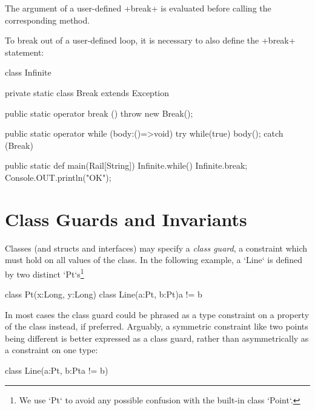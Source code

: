 The argument of a user-defined \xcd+break+ is
evaluated before calling the corresponding method.

\begin{ex}
  To break out of a user-defined loop, it is necessary to also define
  the \xcd+break+ statement:
\begin{xten}
class Infinite {
  private static class Break extends Exception {}

  public static operator break () {
    throw new Break();
  }

  public static operator while (body:()=>void) {
    try {
      while(true) {
        body();
      }
    } catch (Break) {}
  }

  public static def main(Rail[String]) {
    Infinite.while() {
      Infinite.break;
    }
    Console.OUT.println("OK");
  }
}
\end{xten}
%
\end{ex}



\section{Class Guards and Invariants}\label{DepType:ClassGuard}


Classes (and structs and interfaces) may specify a {\em class guard}, a
constraint which must hold on all values of the class.    In the following
example, a \xcd`Line` is defined by two distinct \xcd`Pt`s\footnote{We use \xcd`Pt`
to avoid any possible confusion with the built-in class \xcd`Point`.}
\begin{xten}
class Pt(x:Long, y:Long){}
class Line(a:Pt, b:Pt){a != b} {}
\end{xten}
%

In most cases the class guard could be phrased as a type constraint on a property of
the class instead, if preferred.  Arguably, a symmetric constraint like two
points being different is better expressed as a class guard, rather than
asymmetrically as a constraint on one type: 
\begin{xten}
class Line(a:Pt, b:Pt{a != b}) {}
\end{xten}
%




